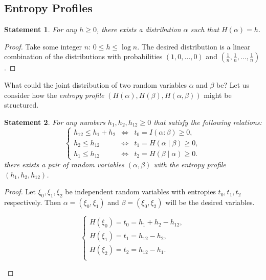 \documentclass[12pt,sans]{article}
\theoremstyle{definition}
\theoremstyle{plain}
\newtheorem{statement}{Statement}[section]
\theoremstyle{remark}
\begin{document}
\subsection{Entropy Profiles}
\begin{statement}
    For any \(h \ge 0\), there exists a distribution \(\alpha\) such that \(H(\alpha) = h\).
\end{statement}
\begin{proof}
    Take some integer \(n\): \(0 \le h \le \log n\). The desired distribution is a linear combination of the distributions with probabilities \((1, 0, \dotsc, 0)\) and \((\frac{1}{n}, \frac{1}{n}, \dotsc, \frac{1}{n})\).
\end{proof}

What could the joint distribution of two random variables \(\alpha\) and \(\beta\) be? Let us consider how the \emph{entropy profile} \((H(\alpha), H(\beta), H(\alpha, \beta))\) might be structured.

\begin{statement}
    For any numbers \(h_1, h_2, h_{12} \ge 0\) that satisfy the following relations:
\[
    \left\{
    \begin{array}{lll}
        h_{12} \le h_1 + h_2 & \iff & t_0 = I(\alpha:\beta) \ge 0,\\
        h_{2} \le h_{12}     & \iff & t_1 = H(\alpha \mid \beta) \ge 0,\\
        h_{1} \le h_{12}     & \iff & t_2 = H(\beta \mid \alpha) \ge 0.
    \end{array}
    \right.
\]
    there exists a pair of random variables \((\alpha, \beta)\) with the entropy profile \((h_1, h_2, h_{12})\).

\end{statement}
\begin{proof}
    Let \(\xi_0, \xi_1, \xi_2\) be independent random variables with entropies \(t_0, t_1, t_2\) respectively. Then \(\alpha = (\xi_0, \xi_1)\) and \(\beta = (\xi_0, \xi_2)\) will be the desired variables.
    \begin{center} \mbox{}\hfill
    \parbox{.4\textwidth}{\centering{}}\hfill
    	\parbox{.5\textwidth}{
            \[
            \begin{cases}
                H(\xi_0) = t_0 = h_1 + h_2 - h_{12},\\
                H(\xi_1) = t_1 = h_{12} - h_{2},\\
                H(\xi_2) = t_2 = h_{12} - h_{1}.\\
            \end{cases}
            \]\qedhere}
    \end{center}
\end{proof}
\end{document}
